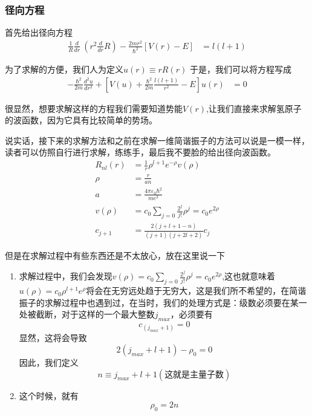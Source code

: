 \documentclass{article}
\newcommand{\D}[2]{\frac{d}{d#2}#1}
\begin{document}
\subsubsection{径向方程}
首先给出径向方程
\begin{align*}
	\frac{1}{R}\D{~}{r}\left(r^2\D{R}{r}\right)-\frac{2mr^2}{\hbar^2}\left[V(r)-E\right] & =l(l+1)
\end{align*}

为了求解的方便，我们人为定义$u(r)\equiv rR(r)$
于是，我们可以将方程写成
\begin{align*}
	-\frac{\hbar^2}{2m}\frac{d^2u}{dr^2}+\left[V(u)+\frac{\hbar^2}{2m}\frac{l(l+1)}{r^2}-E\right]u(r) & =0
\end{align*}

很显然，想要求解这样的方程我们需要知道势能$V(r)$,让我们直接来求解氢原子的波函数，因为它具有比较简单的势场。

说实话，接下来的求解方法和之前在求解一维简谐振子的方法可以说是一模一样，读者可以仿照自行进行求解，练练手，最后我不要脸的给出径向波函数。
\begin{align*}
	R_{nl}(r) & =\frac{1}{r}\rho^{l+1}e^{-\rho}v(\rho)            \\
	\rho      & =\frac{r}{an}                                     \\
	a         & =\frac{4\pi\varepsilon_0\hbar^2}{me^2}            \\
	v(\rho)   & =c_0\sum_{j=0}\frac{2^j}{j!}\rho^{j}=c_0e^{2\rho} \\
	c_{j+1}   & =\frac{2(j+l+1-n)}{(j+1)(j+2l+2)}c_{j}
\end{align*}

但是在求解过程中有些东西还是不太放心，放在这里说一下
\begin{enumerate}
	\item 求解过程中，我们会发现$v(\rho)=c_0\sum_{j=0}\frac{2^j}{j!}\rho^{j}=c_0e^{2\rho}$,这也就意味着$u(\rho)=c_0\rho^{l+1}e^\rho$将会在无穷远处趋于无穷大，这是我们所不希望的，在简谐振子的求解过程中也遇到过，在当时，我们的处理方式是：级数必须要在某一处被截断，对于这样的一个最大整数$j_{max}$，必须要有
	      \begin{equation*}
		      c_{(j_{max}+1)}=0
	      \end{equation*}
	      显然，这将会导致
	      \begin{equation*}
		      2(j_{max}+l+1)-\rho_0=0
	      \end{equation*}
	      因此，我们定义
	      \begin{equation*}
		      n\equiv j_{max}+l+1(\text{这就是主量子数})
	      \end{equation*}
	\item 这个时候，就有
	      \begin{equation*}
		      \rho_0=2n
	      \end{equation*}
\end{enumerate}
\end{document}
